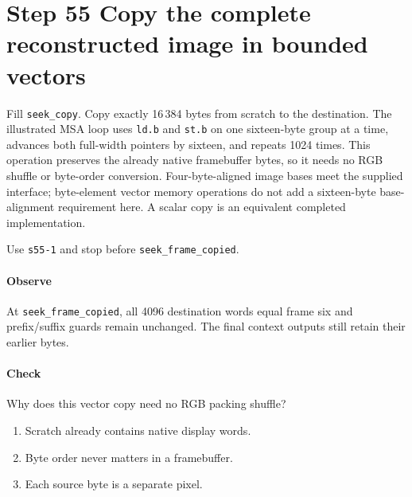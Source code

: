 \section{Step 55 Copy the complete reconstructed image in bounded vectors}
Fill \texttt{seek\_copy}. Copy exactly 16\,384 bytes from scratch to the destination. The illustrated MSA loop uses \texttt{ld.b} and \texttt{st.b} on one sixteen-byte group at a time, advances both full-width pointers by sixteen, and repeats 1024 times. This operation preserves the already native framebuffer bytes, so it needs no RGB shuffle or byte-order conversion. Four-byte-aligned image bases meet the supplied interface; byte-element vector memory operations do not add a sixteen-byte base-alignment requirement here. A scalar copy is an equivalent completed implementation.

Use \texttt{s55-1} and stop before \texttt{seek\_frame\_copied}.

\paragraph{Observe} At \texttt{seek\_frame\_copied}, all 4096 destination words equal frame six and prefix/suffix guards remain unchanged. The final context outputs still retain their earlier bytes.

\paragraph{Check} Why does this vector copy need no RGB packing shuffle?
\begin{enumerate}[label=\Alph*.]
  \item Scratch already contains native display words.
  \item Byte order never matters in a framebuffer.
  \item Each source byte is a separate pixel.
\end{enumerate}

